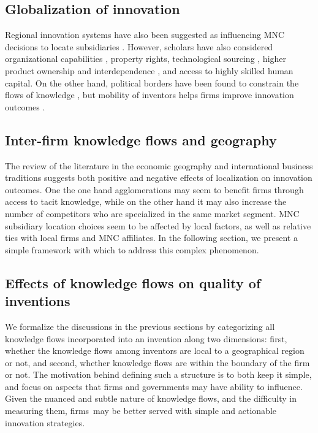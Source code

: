 \documentclass[12pt,letterpaper]{article}
\begin{document}
\subsection{Globalization of innovation}
Regional innovation systems have also been suggested as influencing MNC decisions to locate subsidiaries \citep{Anderson2005}. However, scholars have also considered organizational capabilities \citep{Zhao2006}, property rights, technological sourcing \citep{Florida1997}, higher product ownership and interdependence \cite{Pearce1999}, and access to highly skilled human capital. On the other hand, political borders have been found to constrain the flows of knowledge \citep{Singh2013}, but mobility of inventors helps firms improve innovation outcomes \citep*{Alnuaimi2012b}.


\subsection{Inter-firm knowledge flows and geography}
The review of the literature in the economic geography and international business traditions suggests both positive and negative effects of localization on innovation outcomes.  One the one hand agglomerations may seem to benefit firms through access to tacit knowledge, while on the other hand it may also increase the number of competitors who are specialized in the same market segment. MNC subsidiary location choices seem to be affected by local factors, as well as relative ties with local firms and MNC affiliates. In the following section, we present a simple framework with which to address this complex phenomenon.  

\subsection*{Effects of knowledge flows on quality of inventions}

We formalize the discussions in the previous sections by categorizing all knowledge flows incorporated into an invention along two dimensions:  first, whether the knowledge flows among inventors are local to a geographical region or not, and second, whether knowledge flows are within the boundary of the firm or not. The motivation behind defining such a structure is to both keep it simple, and focus on aspects that firms and governments may have ability to influence. Given the nuanced and subtle nature of knowledge flows, and the difficulty in measuring them, firms\textquotesingle \ may be better served with simple and actionable innovation strategies. \par
\end{document}
